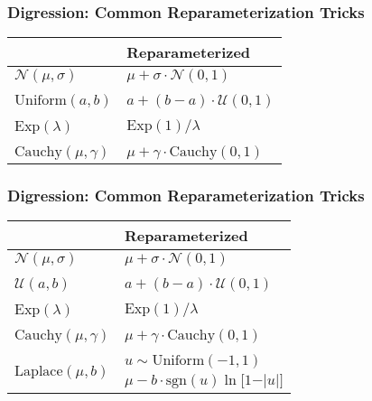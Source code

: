 \documentclass{beamer}
\begin{document}
\begin{frame}
  \frametitle{Digression: Common Reparameterization Tricks}
  \begin{center}
  \begin{tabular}{C{5cm}C{5cm}}
  \toprule
  {} & Reparameterized \\
  \midrule
  $\mathcal{N}(\mu, \sigma)$   &  $\mu + \sigma \cdot \mathcal{N}(0, 1)$ \\
  \\
  $\text{Uniform}(a, b)$   &  $a + (b - a) \cdot \mathcal{U}(0, 1)$ \\
  \\
  $\text{Exp}(\lambda)$   &  $\text{Exp}(1) / \lambda$ \\
  \\
  $\text{Cauchy}(\mu, \gamma)$   &  $\mu + \gamma \cdot \text{Cauchy}(0, 1)$ \\
  \bottomrule
  \end{tabular}
  \end{center}
\end{frame}

\begin{frame}
  \frametitle{Digression: Common Reparameterization Tricks}
  \begin{center}
  \begin{tabular}{C{5cm}C{5cm}}
  \toprule
  {} & Reparameterized \\
  \midrule
  $\mathcal{N}(\mu, \sigma)$   &  $\mu + \sigma \cdot \mathcal{N}(0, 1)$ \\
  \\
  $\mathcal{U}(a, b)$   &  $a + (b - a) \cdot \mathcal{U}(0, 1)$ \\
  \\
  $\text{Exp}(\lambda)$   &  $\text{Exp}(1) / \lambda$ \\
  \\
  $\text{Cauchy}(\mu, \gamma)$   &  $\mu + \gamma \cdot \text{Cauchy}(0, 1)$ \\
  \\
    &  $u \sim \text{Uniform}(-1, 1)$ \\
                                          & $\mu - b \cdot \text{sgn}(u) \ln \big[ 1 - \vert u \vert \big]$ \\
  \bottomrule
  \end{tabular}
  \end{center}
\end{frame}
\end{document}
